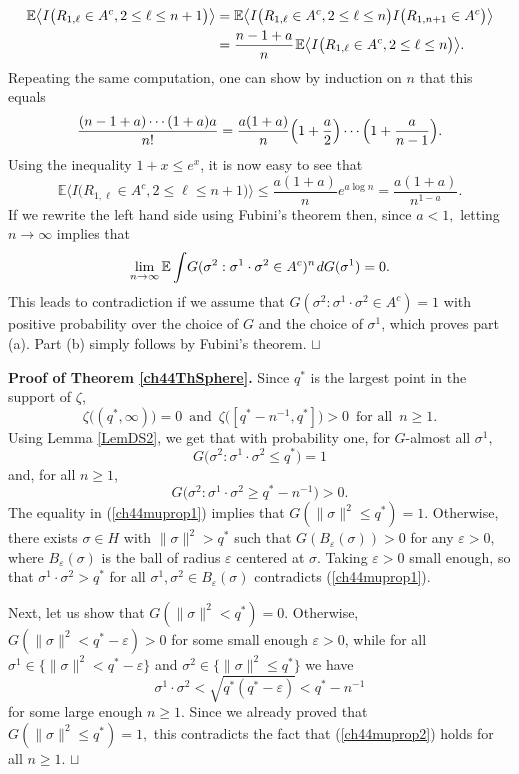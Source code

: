 \documentclass[12pt]{article}
\newcommand{\eps}{{\varepsilon}}
\newcommand{\smsp}{\hspace{0.3mm}}
\newcommand{\e}{\mathbb{E}}
\newcommand{\la}{\langle}
\newcommand{\ra}{\rangle}
\newcommand\qed{\hfill\hbox{\rlap{$\sqcap$}$\sqcup$}}
\theoremstyle{nonumberplain}
\begin{document}
\begin{align*}
\e \bigl\la I\bigl(R_{1,\ell} \in A^c, 2\leq \ell\leq n+1\bigr) \bigr\ra
& =
\e \bigl\la I\bigl(R_{1,\ell} \in A^c, 2\leq \ell\leq n\bigr) I\bigl(R_{1,n+1} \in A^c\bigr) \bigr\ra
\\
&=
\frac{n-1+a}{n}\smsp \e \bigl \la I\bigl(R_{1,\ell} \in A^c, 2\leq \ell\leq n\bigr) \bigr\ra.
\end{align*}
Repeating the same computation, one can show by induction on $n$ that this equals
$$
\frac{(n-1+a)\cdots(1+a) a}{n!}
=
\frac{a(1+a)}{n}\Bigl(1+\frac{a}{2}\Bigr)\cdots\Bigl(1+\frac{a}{n-1}\Bigr).
$$
Using the inequality $1+x\leq e^x$, it is now easy to see that
$$
\e \bigl\la I\bigl(R_{1,\ell} \in A^c, 2\leq \ell\leq n+1\bigr) \bigr\ra
\leq
\frac{a(1+a)}{n} e^{a\log n}
=
\frac{a(1+a)}{n^{1-a}}.
$$
If we rewrite the left hand side using Fubini's theorem then, since $a<1,$ letting $n\to \infty$ implies that 
$$
\lim_{n\to \infty} \e \int\! G( \sigma^2: \sigma^1\cdot \sigma^2 \in A^c)^n \smsp dG(\sigma^1) =0.
$$   
This leads to contradiction if we assume that $G(\sigma^2: \sigma^1\cdot \sigma^2 \in A^c)=1$ with positive probability over the choice of $G$ and the choice of $\sigma^1$, which proves part (a). Part (b) simply follows by Fubini's theorem.
\qed

\medskip
\noindent\textbf{Proof of Theorem \ref{ch44ThSphere}.}
Since $q^*$ is the largest point in the support of $\zeta$, 
$$
\zeta\bigl((q^*,\infty)\bigr) =0 \,\mbox{ and }\, \zeta\bigl([q^*- n^{-1},q^*] \bigr)>0
\,\mbox{ for all }\, 
n\geq 1.
$$ 
Using Lemma \ref{LemDS2}, we get that with probability one, for $G$-almost all $\sigma^1,$
\begin{equation}
G\bigl(\sigma^2 : \sigma^1\cdot \sigma^2 \leq q^* \bigr) = 1
\label{ch44muprop1}
\end{equation}
and, for all $n\geq 1$,
\begin{equation}
G\bigl(\sigma^2 : \sigma^1\cdot \sigma^2 \geq q^*- n^{-1} \bigr) >0.
\label{ch44muprop2}
\end{equation}
The equality in (\ref{ch44muprop1}) implies that $G(\|\sigma\|^2 \leq q^*)=1.$ Otherwise, there exists $\sigma\in H$ with $\|\sigma\|^2> q^*$ such that $G(B_\eps(\sigma))>0$ for any $\eps>0,$ where $B_\eps(\sigma)$ is the ball of radius $\eps$ centered at $\sigma.$ Taking $\eps>0$ small enough, so that $\sigma^1\cdot \sigma^2> q^*$ for all $\sigma^1,\sigma^2\in B_\eps(\sigma)$ contradicts (\ref{ch44muprop1}).  

Next, let us show that $G(\|\sigma\|^2<q^*)=0.$ Otherwise, $G(\|\sigma\|^2< q^* - \eps)>0$ for some small enough $\eps>0$,  while for all $\sigma^1\in \{\|\sigma\|^2< q^* - \eps\}$ and $\sigma^2\in \{\|\sigma\|^2\leq q^*\}$ we have 
$$
\sigma^1\cdot \sigma^2 < \sqrt{q^*(q^*-\eps)} < q^* - n^{-1}
$$
for some large enough $n\geq 1$. Since we already proved that $G(\|\sigma\|^2 \leq q^*)=1,$
this contradicts the fact that (\ref{ch44muprop2}) holds for all $n\geq 1$. 
\qed
\end{document}
